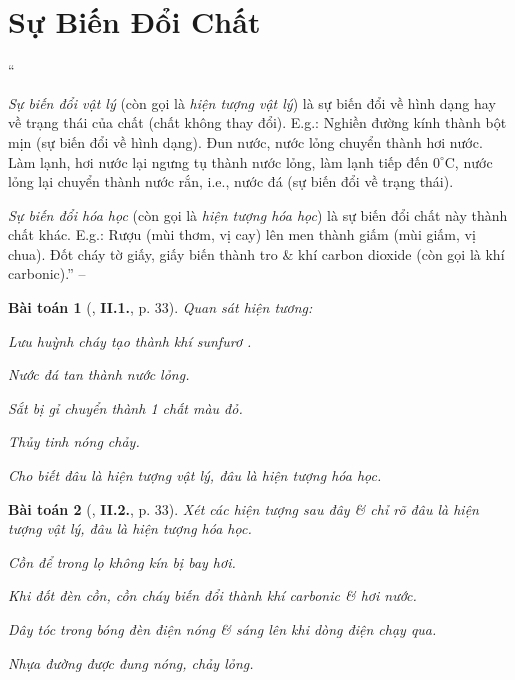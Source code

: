 \documentclass{article}
\numberwithin{equation}{section}
\newtheorem{baitoan}{Bài toán}
\begin{document}
\section{Sự Biến Đổi Chất}
``\begin{enumerate*}
	\item[\textbf{1.}] \textit{Sự biến đổi vật lý} (còn gọi là \textit{hiện tượng vật lý}) là sự biến đổi về hình dạng hay về trạng thái của chất (chất không thay đổi). E.g.: Nghiền đường kính thành bột mịn (sự biến đổi về hình dạng). Đun nước, nước lỏng chuyển thành hơi nước. Làm lạnh, hơi nước lại ngưng tụ thành nước lỏng, làm lạnh tiếp đến $0^\circ$C, nước lỏng lại chuyển thành nước rắn, i.e., nước đá (sự biến đổi về trạng thái).
	\item[\textbf{2.}] \textit{Sự biến đổi hóa học} (còn gọi là \textit{hiện tượng hóa học}) là sự biến đổi chất này thành chất khác. E.g.: Rượu (mùi thơm, vị cay) lên men thành giấm (mùi giấm, vị chua). Đốt cháy tờ giấy, giấy biến thành tro \& khí carbon dioxide  (còn gọi là khí carbonic).'' -- \cite[Chap. 2, p. 32]{Truong2021}
\end{enumerate*}

\begin{baitoan}[\cite{Truong2021}, \textbf{II.1.}, p. 33]
	Quan sát hiện tương:
	\begin{enumerate*}
		\item[(a)] Lưu huỳnh cháy tạo thành khí sunfurơ \emph{}.
		\item[(b)] Nước đá tan thành nước lỏng.
		\item[(c)] Sắt bị gỉ chuyển thành 1 chất màu đỏ.
		\item[(d)] Thủy tinh nóng chảy.
	\end{enumerate*}
	Cho biết đâu là hiện tượng vật lý, đâu là hiện tượng hóa học.
\end{baitoan}

\begin{baitoan}[\cite{Truong2021}, \textbf{II.2.}, p. 33]
	Xét các hiện tượng sau đây \& chỉ rõ đâu là hiện tượng vật lý, đâu là hiện tượng hóa học.
	\begin{enumerate*}
		\item[(a)] Cồn để trong lọ không kín bị bay hơi.
		\item[(b)] Khi đốt đèn cồn, cồn cháy biến đổi thành khí carbonic \& hơi nước.
		\item[(c)] Dây tóc trong bóng đèn điện nóng \& sáng lên khi dòng điện chạy qua.
		\item[(d)] Nhựa đường được đung nóng, chảy lỏng.
	\end{enumerate*}
\end{baitoan}
\end{document}
